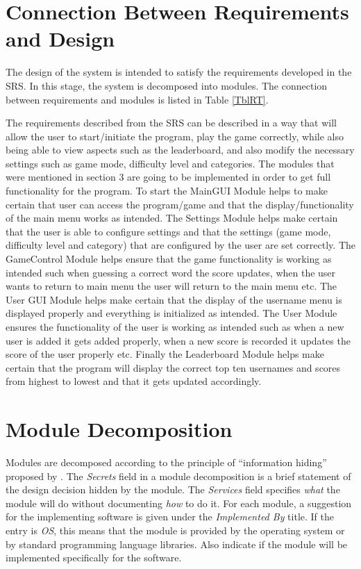 \documentclass[12pt, titlepage]{article}
\begin{document}
\section{Connection Between Requirements and Design} \label{SecConnection}

The design of the system is intended to satisfy the requirements developed in
the SRS. In this stage, the system is decomposed into modules. The connection
between requirements and modules is listed in Table \ref{TblRT}.

The requirements described from the SRS can be described in a way that will allow the user to start/initiate the program, play the game correctly, while also being able to view aspects such as the leaderboard, and also modify the necessary settings such as game mode, difficulty level and categories. The modules that were mentioned in section 3 are going to be implemented in order to get full functionality for the program. To start the MainGUI Module helps to make certain that user can access the program/game and that the display/functionality of the main menu works as intended. The Settings Module helps make certain that the user is able to configure settings and that the settings (game mode, difficulty level and category) that are configured by the user are set correctly. The GameControl Module helps ensure that the game functionality is working as intended such when guessing a correct word the score updates, when the user wants to return to main menu the user will return to the main menu etc. The User GUI Module helps make certain that the display of the username menu is displayed properly and everything is initialized as intended. The User Module ensures the functionality of the user is working as intended such as when a new user is added it gets added properly, when a new score is recorded it updates the score of the user properly etc. Finally the Leaderboard Module helps make certain that the program will display the correct top ten usernames and scores from highest to lowest and that it gets updated accordingly.

\section{Module Decomposition} \label{SecMD}

Modules are decomposed according to the principle of ``information hiding''
proposed by \citet{ParnasEtAl1984}. The \emph{Secrets} field in a module
decomposition is a brief statement of the design decision hidden by the
module. The \emph{Services} field specifies \emph{what} the module will do
without documenting \emph{how} to do it. For each module, a suggestion for the
implementing software is given under the \emph{Implemented By} title. If the
entry is \emph{OS}, this means that the module is provided by the operating
system or by standard programming language libraries.  Also indicate if the
module will be implemented specifically for the software.
\end{document}
